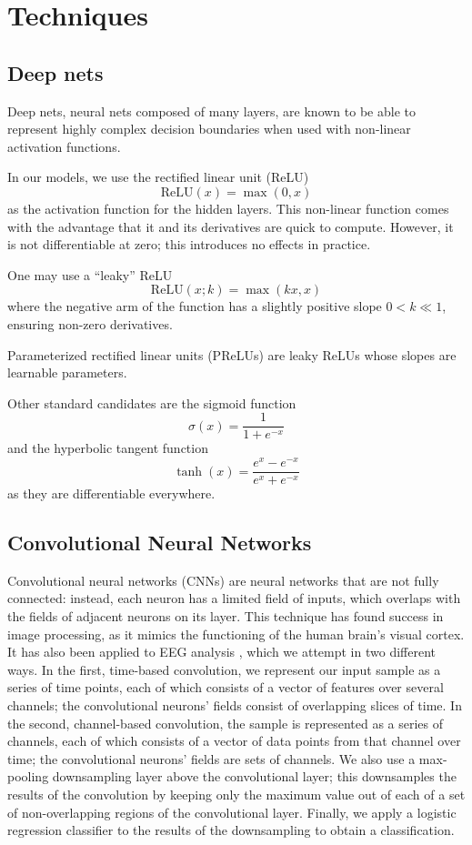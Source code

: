 \documentclass{article} %
\begin{document}
\section{Techniques} \label{section:techniques}
\subsection{Deep nets}
Deep nets, neural nets composed of many layers, are known to be able to represent highly complex decision boundaries when used with non-linear activation functions.

In our models, we use the rectified linear unit (ReLU) \cite{ICML:2010NairH10}
\[ \mathrm{ReLU}(x) = \max(0, x) \]
as the activation function for the hidden layers. This non-linear function comes with the advantage that it and its derivatives are quick to compute. However, it is not differentiable at zero; this introduces no effects in practice.

One may use a ``leaky'' ReLU
\[ \mathrm{ReLU}(x; k) = \max(kx, x) \]
where the negative arm of the function has a slightly positive slope $0 < k \ll 1$, ensuring non-zero derivatives.

Parameterized rectified linear units (PReLUs) \cite{DBLP:journals/corr/HeZR015} are leaky ReLUs whose slopes are learnable parameters.

Other standard candidates are the sigmoid function
\[ \sigma(x) = \frac{1}{1+e^{-x}} \]
and the hyperbolic tangent function
\[ \tanh(x) = \frac{e^x - e^{-x}}{e^x + e^{-x}} \]
as they are differentiable everywhere.


\subsection{Convolutional Neural Networks}
Convolutional neural networks (CNNs) \cite{DBLP:conf/nips/KrizhevskySH12} are neural networks that are not fully connected: instead, each neuron has a limited field of inputs, which overlaps with the fields of adjacent neurons on its layer.  This technique has found success in image processing, as it mimics the functioning of the human brain's visual cortex.  It has also been applied to EEG analysis \cite{DBLP:journals/pami/CecottiG11}, which we attempt in two different ways.  In the first, time-based convolution, we represent our input sample as a series of time points, each of which consists of a vector of features over several channels; the convolutional neurons' fields consist of overlapping slices of time.  In the second, channel-based convolution, the sample is represented as a series of channels, each of which consists of a vector of data points from that channel over time; the convolutional neurons' fields are sets of channels.  We also use a max-pooling downsampling layer above the convolutional layer; this downsamples the results of the convolution by keeping only the maximum value out of each of a set of non-overlapping regions of the convolutional layer.  Finally, we apply a logistic regression classifier to the results of the downsampling to obtain a classification.
\end{document}
